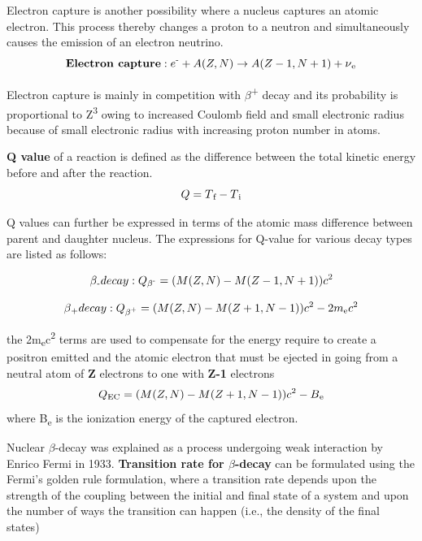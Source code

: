 \documentclass[a4paper,12pt,twoside]{report}
\begin{document}
    Electron capture is another possibility where a nucleus captures an atomic electron. This process thereby changes a proton to a neutron and simultaneously causes the emission of an electron neutrino.
    \begin{equation}
  \textbf{Electron capture}:  e\textsuperscript{-} + A(Z,N) \to A(Z-1 , N+1) +{\nu}\textsubscript{e}
    \end{equation}
    
    Electron capture is mainly in competition with $\beta$\textsuperscript{+} decay and its probability is proportional to Z\textsuperscript{3} owing to increased Coulomb field and small electronic radius because of small electronic radius with increasing proton number in atoms.
    
    \textbf{Q value} of a reaction is defined as the difference between the total kinetic energy before and after the reaction. 
\begin{equation}
 Q = T\textsubscript{f} - T\textsubscript{i}
\end{equation}

Q values can further be expressed in terms of the atomic mass difference between parent and daughter nucleus. The expressions for Q-value for various decay types are listed as follows: 

\begin{equation}
\beta\textsubscript{-} decay:
Q\textsubscript{$\beta$\textsuperscript{-}} = (M(Z,N)  - M(Z-1,N+1))c\textsuperscript{2}  
\end{equation}

\begin{equation}
\beta\textsubscript{+} decay:
Q\textsubscript{$\beta$\textsuperscript{+}} = (M(Z,N)  - M(Z+1,N-1))c\textsuperscript{2} - 2m\textsubscript{e}c\textsuperscript{2}
\end{equation}

the 2m\textsubscript{e}c\textsuperscript{2} terms are used to compensate for the energy require to create a positron emitted and the atomic electron that must be ejected in going from a neutral atom of \textbf{Z} electrons to one with \textbf{Z-1} electrons
    \begin{equation}
        Q\textsubscript{EC} = (M(Z,N)  - M(Z+1,N-1))c\textsuperscript{2}-B\textsubscript{e}
    \end{equation}
    where B\textsubscript{e} is the ionization energy of the captured electron.
    
Nuclear $\beta$-decay was explained as a process undergoing weak interaction by Enrico Fermi \cite{fermitheory} in 1933. \textbf{Transition rate for $\beta$-decay} can be formulated using the Fermi's golden rule formulation, where a transition rate depends upon the strength of the coupling between the initial and final state of a system and upon the number of ways the transition can happen (i.e., the density of the final states)
\end{document}

